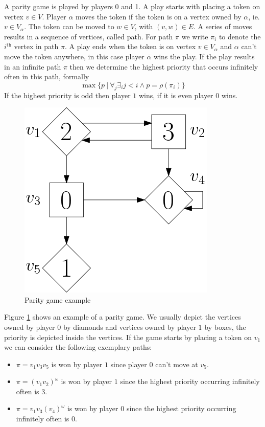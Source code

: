 A parity game is played by players 0 and 1. A play starts with placing a token on vertex $v \in V$. Player $\alpha$ moves the token if the token is on a vertex owned by $\alpha$, ie. $v \in V_\alpha$. The token can be moved to $w \in V$, with $(v,w) \in E$. A series of moves results in a sequence of vertices, called path. For path $\pi$ we write $\pi_i$ to denote the $i^{\text{th}}$ vertex in path $\pi$. A play ends when the token is on vertex $v \in V_\alpha$ and $\alpha$ can't move the token anywhere, in this case player $\overline{\alpha}$ wins the play. If the play results in an infinite path $\pi$ then we determine the highest priority that occurs infinitely often in this path, formally
\[ \max\{ p \ |\ \forall_j \exists_i j < i \wedge p = \rho(\pi_i) \}\] 
If the highest priority is odd then player $1$ wins, if it is even player $0$ wins.
\begin{figure}[h]
	\centering
	\includegraphics[scale=0.3]{Examples/SimplePG/PG}
	\caption[Parity game example]{Parity game example}
	\label{fig:simplepgpg}
\end{figure}

Figure \ref{fig:simplepgpg} shows an example of a parity game. We usually depict the vertices owned by player $0$ by diamonds and vertices owned by player $1$ by boxes, the priority is depicted inside the vertices. If the game starts by placing a token on $v_1$ we can consider the following exemplary paths:
\begin{itemize}
	\item $\pi = v_1v_3v_5$ is won by player $1$ since player $0$ can't move at $v_5$.
	\item $\pi = (v_1v_2)^\omega$ is won by player $1$ since the highest priority occurring infinitely often is 3.
	\item $\pi = v_1v_3(v_4)^\omega$ is won by player $0$ since the highest priority occurring infinitely often is $0$.
\end{itemize}


